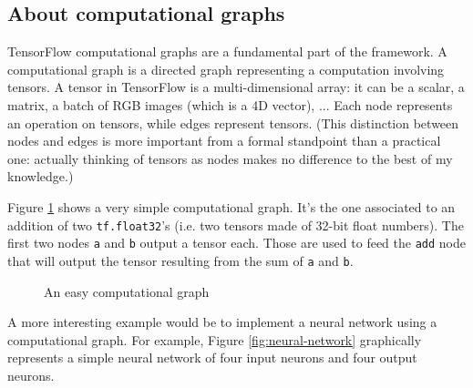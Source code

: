 \subsection{About computational graphs}
\label{subsec:computational-graph}

TensorFlow computational graphs are a fundamental part of the
framework. A computational graph is a directed graph representing a
computation involving tensors. A tensor in TensorFlow is a
multi-dimensional array: it can be a scalar, a matrix, a batch of RGB
images (which is a 4D vector), ... Each node represents an operation on
tensors, while edges represent tensors. (This distinction between nodes
and edges is more important from a formal standpoint than a practical
one: actually thinking of tensors as nodes makes no difference to the
best of my knowledge.)

Figure \ref{fig:easy-graph} shows a very simple computational graph.
It's the one associated to an addition of two \texttt{tf.float32}'s
(i.e. two tensors made of 32-bit float numbers). The first two nodes
\texttt{a} and \texttt{b} output a tensor each. Those are used to feed
the \texttt{add} node that will output the tensor resulting from the
sum of \texttt{a} and \texttt{b}.

\begin{figure}
  \centering
  \caption[easy-graph]{An easy computational graph}
  \label{fig:easy-graph}
\end{figure}

A more interesting example would be to implement a neural network using
a computational graph. For example, Figure \ref{fig:neural-network}
graphically represents a simple neural network of four input neurons
and four output neurons.

